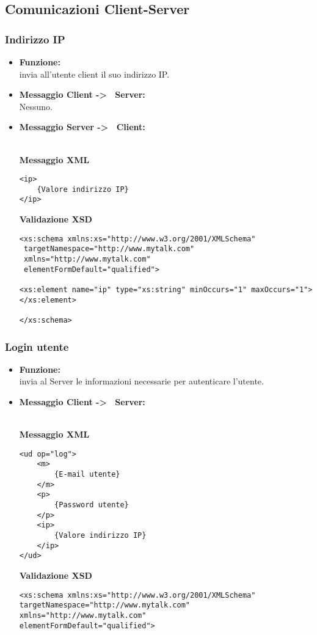 \subsection{Comunicazioni Client-Server}{

	\subsubsection{Indirizzo IP}{
	\label{opIP}
	
		\begin{itemize}
			\item[] \textbf{Funzione:}{\\
				invia all'utente client il suo indirizzo IP.
				}
			
			\item[] \textbf{Messaggio Client -\textgreater~ Server:}{\\
				Nessuno.
				}
			\item[] \textbf{Messaggio Server -\textgreater~ Client:}{\\
			\textbf{Messaggio XML}\\
				\begin{lstlisting}
<ip>
	{Valore indirizzo IP}
</ip>
				\end{lstlisting}
			\textbf{Validazione XSD}\\
				\begin{lstlisting}
<xs:schema xmlns:xs="http://www.w3.org/2001/XMLSchema" 
 targetNamespace="http://www.mytalk.com" 
 xmlns="http://www.mytalk.com" 
 elementFormDefault="qualified">

<xs:element name="ip" type="xs:string" minOccurs="1" maxOccurs="1">
</xs:element>

</xs:schema>	
				\end{lstlisting}
				}
		\end{itemize}		
	}
	
	\subsubsection{Login utente}{
	\label{opLog}
		\begin{itemize}
			\item[] \textbf{Funzione:}{\\
				invia al Server le informazioni necessarie per autenticare l'utente.
				}
			
			\item[] \textbf{Messaggio Client -\textgreater~ Server:}{\\
			\textbf{Messaggio XML}\\
				\begin{lstlisting}
<ud op="log">
	<m>
		{E-mail utente}
	</m>
	<p>
		{Password utente}
	</p>
	<ip>
		{Valore indirizzo IP}
	</ip>
</ud>
				\end{lstlisting}
			\textbf{Validazione XSD}\\
				\begin{lstlisting}
<xs:schema xmlns:xs="http://www.w3.org/2001/XMLSchema"
targetNamespace="http://www.mytalk.com"
xmlns="http://www.mytalk.com"
elementFormDefault="qualified">


\end{lstlisting}}
\end{itemize}}}
